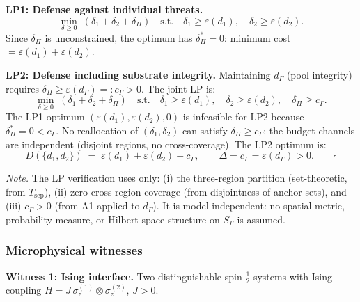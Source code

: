 \documentclass[11pt]{article}
\theoremstyle{remark}
\begin{document}
\textbf{LP1: Defense against individual threats.}
\[
\min_{\delta \ge 0}\; (\delta_1 + \delta_2 + \delta_\Pi) \quad \text{s.t.}\quad \delta_1 \ge \varepsilon(d_1), \quad \delta_2 \ge \varepsilon(d_2).
\]
Since $\delta_\Pi$ is unconstrained, the optimum has $\delta_\Pi^* = 0$: minimum cost $= \varepsilon(d_1) + \varepsilon(d_2)$.

\textbf{LP2: Defense including substrate integrity.}  Maintaining $d_\Gamma$ (pool integrity) requires $\delta_\Pi \ge \varepsilon(d_\Gamma) =: c_\Gamma > 0$.  The joint LP is:
\[
\min_{\delta \ge 0}\; (\delta_1 + \delta_2 + \delta_\Pi) \quad \text{s.t.}\quad \delta_1 \ge \varepsilon(d_1), \quad \delta_2 \ge \varepsilon(d_2), \quad \delta_\Pi \ge c_\Gamma.
\]
The LP1 optimum $(\varepsilon(d_1), \varepsilon(d_2), 0)$ is infeasible for LP2 because $\delta_\Pi^* = 0 < c_\Gamma$.  No reallocation of $(\delta_1, \delta_2)$ can satisfy $\delta_\Pi \ge c_\Gamma$: the budget channels are independent (disjoint regions, no cross-coverage).  The LP2 optimum is:
\[
D(\{d_1, d_2\}) \;=\; \varepsilon(d_1) + \varepsilon(d_2) + c_\Gamma, \qquad \Delta = c_\Gamma = \varepsilon(d_\Gamma) > 0. \qquad\square
\]

\textit{Note.}  The LP verification uses only: (i) the three-region partition (set-theoretic, from $T_{\mathrm{sep}}$), (ii) zero cross-region coverage (from disjointness of anchor sets), and (iii) $c_\Gamma > 0$ (from A1 applied to $d_\Gamma$).  It is model-independent: no spatial metric, probability measure, or Hilbert-space structure on $S_\Gamma$ is assumed.


\subsubsection*{Microphysical witnesses}
\label{sec:witnesses}

\noindent\textbf{Witness 1: Ising interface.}  Two distinguishable spin-$\tfrac{1}{2}$ systems with Ising coupling $H = J\, \sigma_z^{(1)} \otimes \sigma_z^{(2)}$, $J > 0$.
\end{document}
